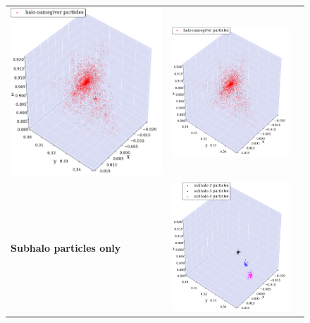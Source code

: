 \begin{subfigures}
\begin{figure}[!htbp]
{\begin{tabular}{|p{.5cm} c c|}
				{\includegraphics[width = .42\textwidth]{images/cosmo/cos-halo-66858-halo-only-saddle.png}} \hspace*{-1em} 		&
				{\includegraphics[width = .42\textwidth]{images/cosmo/cos-halo-66858-halo-only-iter.png}} \hspace*{-1em}		\\
				\begin{sideways}{ \hspace{2cm}\textbf{Subhalo particles only} }\end{sideways}	 \hspace*{-1em}			 &
				{\includegraphics[width = .42\textwidth]{images/cosmo/cos-halo-66858-subhalo-only-saddle.png}} &

\end{tabular}}
\end{figure}
\end{subfigures}
